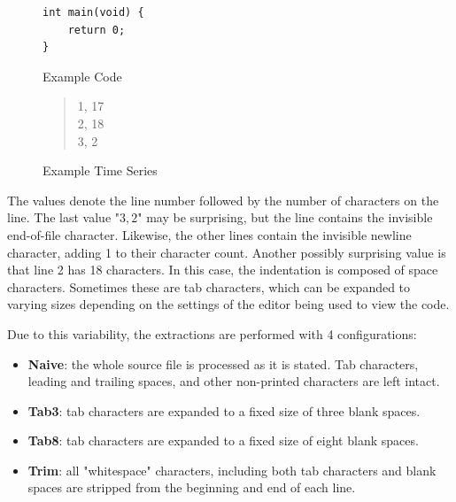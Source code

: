 \documentclass[12pt]{article}
\begin{document}
\begin{figure}[h]
\centering
\begin{minipage}[b]{0.45\linewidth}
\begin{lstlisting}[frame=single]
int main(void) {
	return 0;
}
\end{lstlisting}

\caption{Example Code}
\label{fig:ExampleCode}
\end{minipage}
\quad
\begin{minipage}[b]{0.45\linewidth}
\begin{center}

\begin{quote}
1, 17 \\
2, 18 \\
3, 2
\end{quote}
\end{center}

\caption{Example Time Series}
\label{fig:ExampleTimeSeries}
\end{minipage}
\end{figure}

The values denote the line number followed by the number of characters on the line.  The last value "$3,2$" may be surprising, but the line contains the invisible end-of-file character.  Likewise, the other lines contain the invisible newline character, adding 1 to their character count.  Another possibly surprising value is that line 2 has 18 characters.  In this case, the indentation is composed of space characters.  Sometimes these are tab characters, which can be expanded to varying sizes depending on the settings of the editor being used to view the code.

Due to this variability, the extractions are performed with 4 configurations:
\begin{itemize}
\item \textbf{Naive}: the whole source file is processed as it is stated.   Tab characters, leading and trailing spaces, and other non-printed characters are left intact.
\item \textbf{Tab3}: tab characters are expanded to a fixed size of three blank spaces.
\item \textbf{Tab8}: tab characters are expanded to a fixed size of eight blank spaces.
\item \textbf{Trim}: all "whitespace" characters, including both tab characters and blank spaces are stripped from the beginning and end of each line.
\end{itemize}
\end{document}
